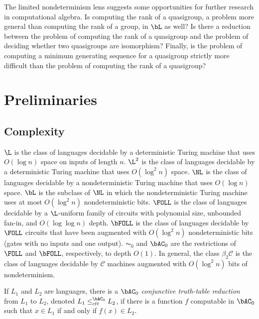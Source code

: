 \documentclass{article}
\begin{document}
The limited nondeterminism lens suggests some opportunities for further research in computational algebra.
Is computing the rank of a quasigroup, a problem more general than computing the rank of a group, in $\bL$ as well?
Is there a reduction between the problem of computing the rank of a quasigroup and the problem of deciding whether two quasigroups are isomorphism?
Finally, is the problem of computing a minimum generating sequence for a quasigroup strictly more difficult than the problem of computing the rank of a quasigroup?

\section{Preliminaries}

\subsection{Complexity}

$\L$ is the class of languages decidable by a deterministic Turing machine that uses $O(\log n)$ space on inputs of length $n$.
$\L^2$ is the class of languages decidable by a deterministic Turing machine that uses $O(\log^2 n)$ space.
$\NL$ is the class of languages decidable by a nondeterministic Turing machine that uses $O(\log n)$ space.
$\bL$ is the subclass of $\NL$ in which the nondeterministic Turing machine uses at most $O(\log^2 n)$ nondeterministic bits.
$\FOLL$ is the class of languages decidable by a $\L$-uniform family of circuits with polynomial size, unbounded fan-in, and $O(\log \log n)$ depth.
$\bFOLL$ is the class of languages decidable by $\FOLL$ circuits that have been augmented with $O(\log^2 n)$ nondeterministic bits (gates with no inputs and one output).
$\AC_0$ and $\bAC_0$ are the restrictions of $\FOLL$ and $\bFOLL$, respectively, to depth $O(1)$.
In general, the class $\beta_2 \mathcal{C}$ is the class of languages decidable by $\mathcal{C}$ machines augmented with $O(\log^2 n)$ bits of nondeterminism.

If $L_1$ and $L_2$ are languages, there is a \emph{$\bAC_0$ conjunctive truth-table reduction} from $L_1$ to $L_2$, denoted $L_1 \leq^{\bAC_0}_{ctt} L_2$, if there is a function $f$ computable in $\bAC_0$ such that $x \in L_1$ if and only if $f(x) \in L_2$.
\end{document}
